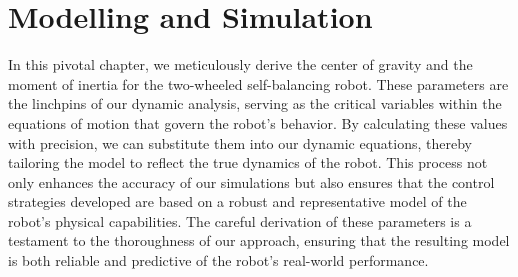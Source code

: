 \chapter{Modelling and Simulation}

\graphicspath{{./Figures/Modeling}}

In this pivotal chapter, we meticulously derive the center of gravity and the moment of inertia for the two-wheeled self-balancing robot. These parameters are the linchpins of our dynamic analysis, serving as the critical variables within the equations of motion that govern the robot's behavior. By calculating these values with precision, we can substitute them into our dynamic equations, thereby tailoring the model to reflect the true dynamics of the robot. This process not only enhances the accuracy of our simulations but also ensures that the control strategies developed are based on a robust and representative model of the robot's physical capabilities. The careful derivation of these parameters is a testament to the thoroughness of our approach, ensuring that the resulting model is both reliable and predictive of the robot's real-world performance.
\newpage

